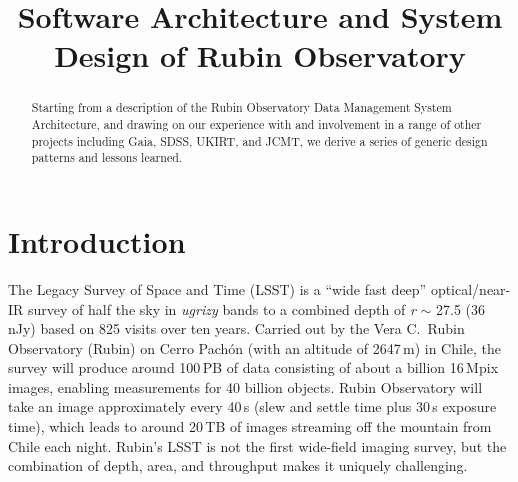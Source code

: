 \documentclass[11pt,twoside]{article}
\begin{document}


\title{Software Architecture and System Design of Rubin Observatory}





\begin{abstract}
Starting from a description of the Rubin Observatory Data Management System Architecture, and drawing on our experience with and involvement in a range of other projects including Gaia, SDSS, UKIRT, and JCMT, we derive a series of generic design patterns and lessons learned.
\end{abstract}

\section{Introduction}

The Legacy Survey of Space and Time (LSST) \citep{2019ApJ...873..111I} is a ``wide fast deep'' optical/near-IR survey of half the sky in \emph{ugrizy} bands to a combined depth of \emph{r} $\sim$ 27.5 (36\,nJy) based on 825 visits over ten years.
Carried out by the Vera C.\ Rubin Observatory (Rubin) on Cerro Pach\'{o}n (with an altitude of 2647\,m) in Chile, the survey will produce around 100\,PB of data consisting of about a billion 16\,Mpix images, enabling measurements for 40 billion objects.
Rubin Observatory will take an image approximately every 40\,s (slew and settle time plus 30\,s exposure time), which leads to around 20\,TB of images streaming off the mountain from Chile each night.
Rubin's LSST is not the first wide-field imaging survey, but the combination of depth, area, and throughput makes it uniquely challenging.
\end{document}
